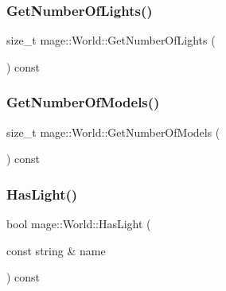 \hypertarget{classmage_1_1_world_a786420d8d8b97065ee591753b7f1541b}{}\label{classmage_1_1_world_a786420d8d8b97065ee591753b7f1541b} 
\subsubsection{\texorpdfstring{Get\+Number\+Of\+Lights()}{GetNumberOfLights()}}
{\footnotesize\ttfamily size\+\_\+t mage\+::\+World\+::\+Get\+Number\+Of\+Lights (\begin{DoxyParamCaption}{ }\end{DoxyParamCaption}) const}

\hypertarget{classmage_1_1_world_a6e04fdde74a2616746cdafd12537c4a7}{}\label{classmage_1_1_world_a6e04fdde74a2616746cdafd12537c4a7} 
\subsubsection{\texorpdfstring{Get\+Number\+Of\+Models()}{GetNumberOfModels()}}
{\footnotesize\ttfamily size\+\_\+t mage\+::\+World\+::\+Get\+Number\+Of\+Models (\begin{DoxyParamCaption}{ }\end{DoxyParamCaption}) const}

\hypertarget{classmage_1_1_world_af83318e3810a5658aa37285df708aa81}{}\label{classmage_1_1_world_af83318e3810a5658aa37285df708aa81} 
\subsubsection{\texorpdfstring{Has\+Light()}{HasLight()}\hspace{0.1cm}{\footnotesize\ttfamily [1/2]}}
{\footnotesize\ttfamily bool mage\+::\+World\+::\+Has\+Light (\begin{DoxyParamCaption}\item[{const string \&}]{name }\end{DoxyParamCaption}) const}

\hypertarget{classmage_1_1_world_ac76eb3df75c68ec28b7a9db9b0576171}{}\label{classmage_1_1_world_ac76eb3df75c68ec28b7a9db9b0576171} 
